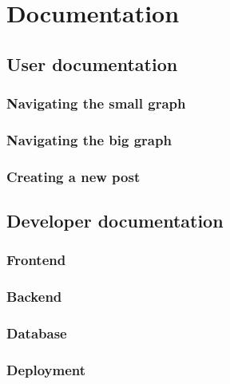 \chapter{Documentation}

\section{User documentation}

\subsection{Navigating the small graph}

\subsection{Navigating the big graph}

\subsection{Creating a new post}

\section{Developer documentation}

\subsection{Frontend}

\subsection{Backend}

\subsection{Database}

\subsection{Deployment}